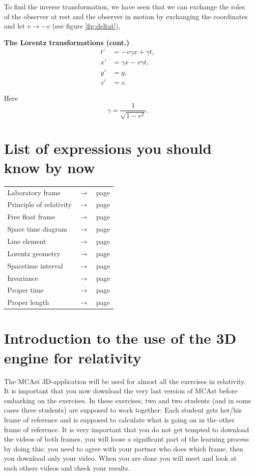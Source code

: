 {\begin{multicols}{2}
To find the inverse transformation, we have seen that we can exchange the roles of the observer at rest and the observer in motion by exchanging the coordinates and let $v\rightarrow -v$ (see figure \ref{fig:deltat}),
\begin{formbox}
\textbf{The Lorentz transformations (cont.)}
\begin{align}
t'&=-v\gamma x+\gamma t,\label{eq:blorentz1}\\
x'&=\gamma x-v\gamma t,\label{eq:blorentz2}\\
y'&=y,\nonumber \\
z'&=z.\nonumber
\end{align}
\end{formbox}
Here 
\[
\gamma=\frac{1}{\sqrt{1-v^2}}.
\]

\section{List of expressions you should know by now}
\begin{tabular}{l c l}
Laboratory frame 	& $\rightarrow$ & page \pageref{pg:labframe}\\
Principle of relativity & $\rightarrow$ & page \pageref{pg:por}\\
Free float frame 	& $\rightarrow$ & page \pageref{pg:ff}\\
Space time diagram	& $\rightarrow$ & page \pageref{pg:spacetimediag}\\
Line element 		& $\rightarrow$ & page \pageref{pg:lineelement}\\
Lorentz geometry 	& $\rightarrow$ & page \pageref{pg:lorentz}\\
Spacetime interval 	& $\rightarrow$ & page \pageref{pg:spacetimeinterval}\\
Invariance 		& $\rightarrow$ & page \pageref{pg:invariant}\\
Proper time		& $\rightarrow$ & page \pageref{pg:propertime}\\
Proper length 		& $\rightarrow$ & page \pageref{pg:properlength}
\end{tabular}

\section{Introduction to the use of the 3D engine for relativity}

The MCAst 3D-application will be used for almost all the exercises in relativity. It is important that you now download the very last version of MCAst before embarking on the exercises. In these exercises, two and two students (and in some cases three students) are supposed to work together: Each student gets her/his frame of reference and is supposed to calculate what is going on in the other frame of reference. It is very important that you do not get tempted to download the videos of both frames, you will loose a significant part of the learning process by doing this: you need to agree with your partner who does which frame, then you download only your video. When you are done you will meet and look at each others videos and check your results.


\end{multicols}}
